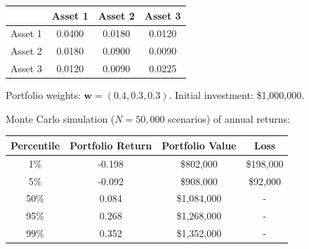 \documentclass[12pt]{article}
\begin{document}
\begin{center}
\begin{tabular}{cccc}
\toprule
& Asset 1 & Asset 2 & Asset 3 \\
\midrule
Asset 1 & 0.0400 & 0.0180 & 0.0120 \\
Asset 2 & 0.0180 & 0.0900 & 0.0090 \\
Asset 3 & 0.0120 & 0.0090 & 0.0225 \\
\bottomrule
\end{tabular}
\end{center}

Portfolio weights: $\mathbf{w} = (0.4, 0.3, 0.3)$. Initial investment: \$1,000,000.

Monte Carlo simulation ($N = 50,000$ scenarios) of annual returns:

\begin{center}
\begin{tabular}{cccc}
\toprule
Percentile & Portfolio Return & Portfolio Value & Loss \\
\midrule
1\% & -0.198 & \$802,000 & \$198,000 \\
5\% & -0.092 & \$908,000 & \$92,000 \\
50\% & 0.084 & \$1,084,000 & - \\
95\% & 0.268 & \$1,268,000 & - \\
99\% & 0.352 & \$1,352,000 & - \\
\bottomrule
\end{tabular}
\end{center}
\end{document}
